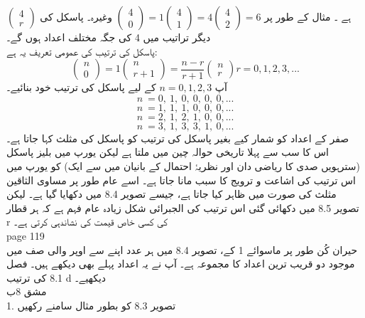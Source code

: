  \(\begin{pmatrix} 4 \\ r \end{pmatrix}\)
 ہے
 ۔  مثال کے طور پر
   \(\begin{pmatrix} 4 \\ 0 \end{pmatrix}=1 \begin{pmatrix} 4 \\ 1 \end{pmatrix} =4 \begin{pmatrix} 4 \\ 2\end{pmatrix}=6\)
 وغیرہ۔ پاسکل کی دیگر تراتیب میں 4 کی جگہ مختلف اعداد ہوں گے۔\\

 پاسکل کی ترتیب کی عمومی تعریف یہ ہے:\\
 \[\begin{pmatrix} n \\ 0 \end{pmatrix}=1 \begin{pmatrix} n \\ r +1 \end{pmatrix} = \frac{n-r}{r+1}\begin{pmatrix} n \\ r \end{pmatrix}  r=0 ,1 ,2,3, ... \]
 آپ
 \(n=0,1,2,3\)
 کے لیے پاسکل کی ترتیب خود بنائیے۔\\
 \[ n\ = 0,\: 1,\: 0,\: 0,\: 0,\: 0, ...  \]
\[ n\ = 1,\: 1,\: 1,\: 0,\: 0,\: 0,  ... \]
\[ n\ = 2,\: 1,\: 2,\: 1,\: 0,\: 0, ...  \]
\[ n\ = 3,\: 1,\: 3,\: 3,\: 1,\: 0,  ... \]
 صفر کے اعداد کو شمار کیے بغیر پاسکل کی ترتیب کو پاسکل کی مثلث کہا جاتا ہے۔ اس کا سب سے پہلا تاریخی حوالہ چین میں ملتا ہے لیکن یورپ میں بلیز پاسکل (سترہویں صدی کا ریاضی دان اور نظریۂ احتمال کے بانیان میں سے ایک) کو یورپ میں اس ترتیب کی اشاعت و ترویج کا سبب مانا جاتا ہے۔ اسے عام طور پر مساوی الثاقین مثلث کی صورت میں ظاہر کیا جاتا ہے، جیسے تصویر 8.4 میں دکھایا گیا ہے۔ لیکن تصویر 8.5 میں دکھائی گئی اس ترتیب کی الجبرائی شکل زیادہ عام فہم ہے کہ ہر قطار r کی کسی خاص قیمت کی نشاندہی کرتی ہے۔\\
 \clearpage
 page 119\\
 حیران کُن طور پر ماسوائے 1 کے، تصویر 8.4 میں ہر عدد اپنے سے اوپر والی صف میں موجود دو قریب ترین اعداد کا مجموعہ ہے۔
آپ نے یہ اعداد پہلے بھی دیکھے ہیں۔ فصل 8.1 کی ترتیب d دیکھیے۔\\
مشق 8ب\\
1.
تصویر 8.3 کو بطور مثال سامنے رکھیں\\
